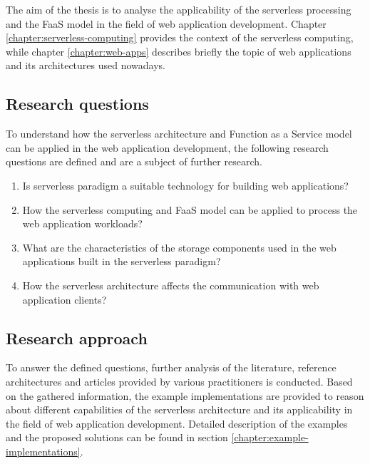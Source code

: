 The aim of the thesis is to analyse the applicability of the serverless processing and the FaaS model in the field of web application development. Chapter \ref{chapter:serverless-computing} provides the context of the serverless computing, while chapter \ref{chapter:web-apps} describes briefly the topic of web applications and its architectures used nowadays. 

\subsection{Research questions} \label{section:research-questions}

To understand how the serverless architecture and Function as a Service model can be applied in the web application development, the following research questions are defined and are a subject of further research.

\begin{enumerate}
    \item Is serverless paradigm a suitable technology for building web applications?
    \item How the serverless computing and FaaS model can be applied to process the web application workloads?
    \item What are the characteristics of the storage components used in the web applications built in the serverless paradigm?
    \item How the serverless architecture affects the communication with web application clients?
\end{enumerate}

\subsection{Research approach} \label{section:research-approach}

To answer the defined questions, further analysis of the literature, reference architectures and articles provided by various practitioners is conducted.
Based on the gathered information, the example implementations are provided to reason about different capabilities of the serverless architecture and its applicability in the field of web application development.
Detailed description of the examples and the proposed solutions can be found in section \ref{chapter:example-implementations}.


